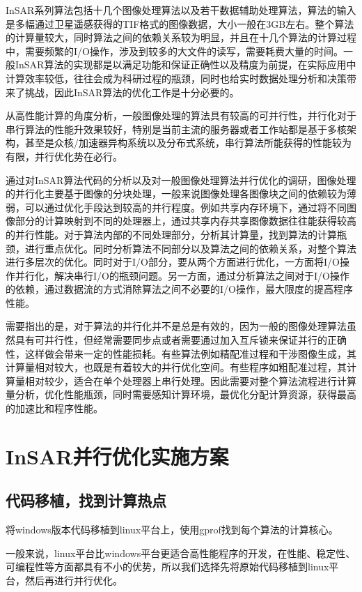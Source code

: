 InSAR系列算法包括十几个图像处理算法以及若干数据辅助处理算法，算法的输入是多幅通过卫星遥感获得的TIF格式的图像数据，大小一般在3GB左右。整个算法的计算量较大，同时算法之间的依赖关系较为明显，并且在十几个算法的计算过程中，需要频繁的I/O操作，涉及到较多的大文件的读写，需要耗费大量的时间。一般InSAR算法的实现都是以满足功能和保证正确性以及精度为前提，在实际应用中计算效率较低，往往会成为科研过程的瓶颈，同时也给实时数据处理分析和决策带来了挑战，因此InSAR算法的优化工作是十分必要的。 

从高性能计算的角度分析，一般图像处理的算法具有较高的可并行性，并行化对于串行算法的性能升效果较好，特别是当前主流的服务器或者工作站都是基于多核架构，甚至是众核/加速器异构系统以及分布式系统，串行算法所能获得的性能较为有限，并行优化势在必行。 

通过对InSAR算法代码的分析以及对一般图像处理算法并行优化的调研，图像处理的并行化主要基于图像的分块处理，一般来说图像处理各图像块之间的依赖较为薄弱，可以通过优化手段达到较高的并行程度。例如共享内存环境下，通过将不同图像部分的计算映射到不同的处理器上，通过共享内存共享图像数据往往能获得较高的并行性能。对于算法内部的不同处理部分，分析其计算量，找到算法的计算瓶颈，进行重点优化。同时分析算法不同部分以及算法之间的依赖关系，对整个算法进行多层次的优化。同时对于I/O部分，要从两个方面进行优化，一方面将I/O操作并行化，解决串行I/O的瓶颈问题。另一方面，通过分析算法之间对于I/O操作的依赖，通过数据流的方式消除算法之间不必要的I/O操作，最大限度的提高程序性能。 

需要指出的是，对于算法的并行化并不是总是有效的，因为一般的图像处理算法虽然具有可并行性，但经常需要同步点或者需要通过加入互斥锁来保证并行的正确性，这样做会带来一定的性能损耗。有些算法例如精配准过程和干涉图像生成，其计算量相对较大，也既是有着较大的并行优化空间。有些程序如粗配准过程，其计算量相对较少，适合在单个处理器上串行处理。因此需要对整个算法流程进行计算量分析，优化性能瓶颈，同时需要感知计算环境，最优化分配计算资源，获得最高的加速比和程序性能。 

\section{InSAR并行优化实施方案}

\subsection{代码移植，找到计算热点}

将windows版本代码移植到linux平台上，使用gprof\citep{graham2004gprof}找到每个算法的计算核心。

一般来说，linux平台比windows平台更适合高性能程序的开发，在性能、稳定性、可编程性等方面都具有不小的优势，所以我们选择先将原始代码移植到linux平台，然后再进行并行优化。

